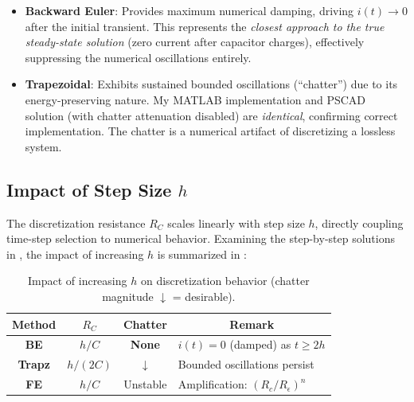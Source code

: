 \begin{itemize}
    \item \textbf{Backward Euler}: Provides maximum numerical damping, driving $i(t) \to 0$ after the initial transient. This represents the \textit{closest approach to the true steady-state solution} (zero current after capacitor charges), effectively suppressing the numerical oscillations entirely.
    
    \item \textbf{Trapezoidal}: Exhibits sustained bounded oscillations (``chatter'') due to its energy-preserving nature. My MATLAB implementation and PSCAD solution (with chatter attenuation disabled) are \textit{identical}, confirming correct implementation. The chatter is a numerical artifact of discretizing a lossless system.
    
\end{itemize}

\subsection{Impact of Step Size $h$}


The discretization resistance $R_C$ scales linearly with step size $h$, directly coupling time-step selection to numerical behavior. Examining the step-by-step solutions in , the impact of increasing $h$ is summarized in :

\begin{table}[h!]
\centering
\renewcommand{\arraystretch}{2.0}
\setlength{\tabcolsep}{6pt}

\begin{tabular}{|c|c|c|l|}
\hline
\rowcolor{mediumGray}
\textbf{Method} & \textbf{$R_C$} & \textbf{Chatter} & \multicolumn{1}{c|}{\textbf{Remark}} \\
\hline
\rowcolor{lightGray}
\textbf{BE} & $h/C$ & {\color{lushGreen} \textbf{None}} & \parbox{5cm}{$i(t) = 0$ (damped) as $t \geq 2h$} \\
\hline
{}
\textbf{Trapz} & $h/(2C)$ & {\color{lushGreen} $\downarrow$} & \parbox{5cm}{Bounded oscillations persist} \\
\hline
{}
\textbf{FE} & $h/C$ & {\color{wineRed} Unstable} & \parbox{5cm}{Amplification: $(R_c/R_\epsilon)^n$} \\
\hline
\end{tabular}

\caption{Impact of increasing $h$ on discretization behavior (chatter magnitude $\downarrow$ = desirable).}
\label{tab:step_size_impact}
\end{table}

